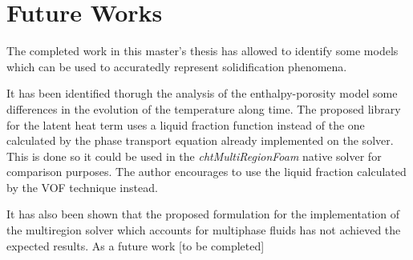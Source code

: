 \chapter{Future Works} %

\label{Chapter6}
\setlength{\parindent}{0.5cm} The completed work in this master's thesis has allowed to identify some models which can be used to accuratedly represent solidification phenomena. 

\noindent It has been identified thorugh the analysis of the enthalpy-porosity model some differences in the evolution of the temperature along time. The proposed library for the latent heat term uses a liquid fraction function instead of the one calculated by the phase transport equation already implemented on the solver. This is done so it could be used in the \textit{chtMultiRegionFoam} native solver for comparison purposes. The author encourages to use the liquid fraction calculated by the VOF technique instead.

\noindent It has also been shown that the proposed formulation for the implementation of the multiregion solver which accounts for multiphase fluids has not achieved the expected results. As a future work  [to be completed]
